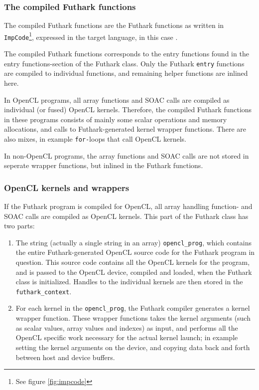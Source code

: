 \begin{description}
\subsubsection{The compiled Futhark functions}
  The compiled Futhark functions are the Futhark functions as written in
  \texttt{ImpCode}\footnote{See figure \ref{fig:impcode}}, expressed in the
  target language, in this case \csharp{}.

  The compiled Futhark functions corresponds to the entry functions found
  in the entry functions-section of the Futhark class.
  Only the Futhark \texttt{entry} functions are compiled to individual functions, and
  remaining helper functions are inlined here.

  In OpenCL programs, all array functions and SOAC calls are compiled as
  individual (or fused) OpenCL kernels. Therefore, the compiled Futhark
  functions in these programs consists of mainly some scalar operations and
  memory allocations, and calls to Futhark-generated kernel wrapper functions.
  There are also mixes, in example \texttt{for-}loops that call OpenCL kernels.
  
  In non-OpenCL programs, the array functions and SOAC calls are not stored in
  seperate wrapper functions, but inlined in the Futhark functions.

\subsubsection{OpenCL kernels and wrappers}
  If the Futhark program is compiled for OpenCL, all array handling function- and
  SOAC calls are compiled as OpenCL kernels. This part of the Futhark class
  has two parts:
  \begin{enumerate}
  \item The string (actually a single string in an array) \texttt{opencl\_prog}, which contains the entire
  Futhark-generated OpenCL source code for the Futhark program in question.
  This source code contains all the OpenCL kernels for the program, and is
  passed to the OpenCL device, compiled and loaded, when the Futhark class is
  initialized. Handles to the individual kernels are then stored in the \texttt{futhark\_context}.

  \item For each kernel in the \texttt{opencl\_prog}, the Futhark compiler
    generates a kernel wrapper function. These wrapper functions takes the
    kernel arguments (such as scalar values, array values and indexes) as input,
    and performs all the OpenCL specific work necessary for the actual kernel
    launch; in example setting the kernel arguments on the device, and copying
    data back and forth between host and device buffers.
  \end{enumerate}


\end{description}
